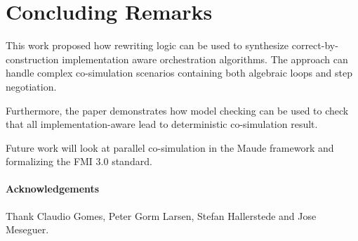 \section{Concluding Remarks}\label{sc:summary}
This work proposed how rewriting logic can be used to synthesize correct-by-construction implementation aware orchestration algorithms.
The approach can handle complex co-simulation scenarios containing both algebraic loops and step negotiation.

Furthermore, the paper demonstrates how model checking can be used to check that all implementation-aware lead to deterministic co-simulation result.


Future work will look at parallel co-simulation in the Maude framework and formalizing the FMI 3.0 standard. 

\paragraph{Acknowledgements}
Thank Claudio Gomes, Peter Gorm Larsen, Stefan Hallerstede and Jose Meseguer.